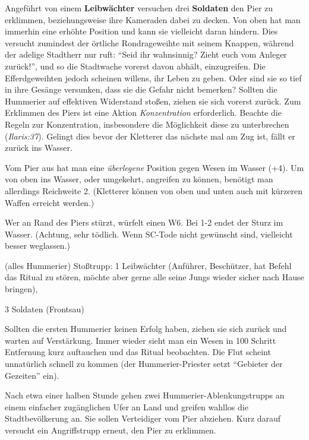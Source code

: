 Angeführt von einem \textbf{Leibwächter} versuchen drei \textbf{Soldaten} den Pier zu erklimmen, beziehungsweise ihre Kameraden dabei zu decken. Von oben hat man immerhin eine erhöhte Position und kann sie vielleicht daran hindern.
Dies versucht zumindest der örtliche Rondrageweihte mit seinem Knappen, während der adelige Stadtherr nur ruft: \enquote{Seid ihr wahnsinnig? Zieht euch vom Anleger zurück!}, und so die Stadtwache vorerst davon abhält, einzugreifen.
Die Efferdgeweihten jedoch scheinen willens, ihr Leben zu geben.
Oder sind sie so tief in ihre Gesänge versunken, dass sie die Gefahr nicht bemerken?
Sollten die Hummerier auf effektiven Widerstand stoßen, ziehen sie sich vorerst zurück. 
\smallskip 
\newline 
{}
Zum Erklimmen des Piers ist eine Aktion \textit{Konzentration} erforderlich. Beachte die Regeln zur Konzentration, insbesondere die Möglichkeit diese zu unterbrechen (\textit{Ilaris:37}).
Gelingt dies bevor der Kletterer das nächste mal am Zug ist, fällt er zurück ins Wasser. 

Vom Pier aus hat man eine \textit{überlegene} Position gegen Wesen im Wasser  (+4). Um von oben ins Wasser, oder umgekehrt, angreifen zu können, benötigt man allerdings Reichweite 2. (Kletterer können von oben und unten auch mit kürzeren Waffen erreicht werden.)

Wer an Rand des Piers stürzt, würfelt einen W6. Bei 1-2 endet der Sturz im Wasser. (Achtung, sehr tödlich. Wenn SC-Tode nicht gewünscht sind, vielleicht besser weglassen.)

 (alles Hummerier) \newline
Stoßtrupp: 1 Leibwächter (Anführer, Beschützer, hat Befehl das Ritual zu stören, möchte aber gerne alle seine Jungs wieder sicher nach Hause bringen),

3 Soldaten (Frontsau)

Sollten die ersten Hummerier keinen Erfolg haben, ziehen sie sich zurück und warten auf Verstärkung. Immer wieder sieht man ein Wesen in 100 Schritt Entfernung  kurz auftauchen und das Ritual beobachten. Die Flut scheint unnatürlich schnell zu kommen (der Hummerier-Priester setzt \enquote{Gebieter der Gezeiten} ein).

Nach etwa einer halben Stunde gehen zwei Hummerier-Ablenkungstrupps an einem einfacher zugänglichen Ufer an Land und greifen wahllos die Stadtbevölkerung an. Sie sollen Verteidiger vom Pier abziehen. Kurz darauf versucht ein Angriffstrupp erneut, den Pier zu erklimmen. 


